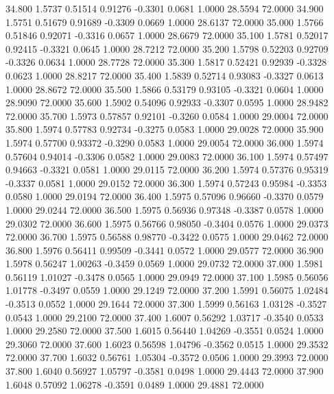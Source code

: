   34.800   1.5737   0.51514   0.91276  -0.3301   0.0681   1.0000  28.5594  72.0000
  34.900   1.5751   0.51679   0.91689  -0.3309   0.0669   1.0000  28.6137  72.0000
  35.000   1.5766   0.51846   0.92071  -0.3316   0.0657   1.0000  28.6679  72.0000
  35.100   1.5781   0.52017   0.92415  -0.3321   0.0645   1.0000  28.7212  72.0000
  35.200   1.5798   0.52203   0.92709  -0.3326   0.0634   1.0000  28.7728  72.0000
  35.300   1.5817   0.52421   0.92939  -0.3328   0.0623   1.0000  28.8217  72.0000
  35.400   1.5839   0.52714   0.93083  -0.3327   0.0613   1.0000  28.8672  72.0000
  35.500   1.5866   0.53179   0.93105  -0.3321   0.0604   1.0000  28.9090  72.0000
  35.600   1.5902   0.54096   0.92933  -0.3307   0.0595   1.0000  28.9482  72.0000
  35.700   1.5973   0.57857   0.92101  -0.3260   0.0584   1.0000  29.0004  72.0000
  35.800   1.5974   0.57783   0.92734  -0.3275   0.0583   1.0000  29.0028  72.0000
  35.900   1.5974   0.57700   0.93372  -0.3290   0.0583   1.0000  29.0054  72.0000
  36.000   1.5974   0.57604   0.94014  -0.3306   0.0582   1.0000  29.0083  72.0000
  36.100   1.5974   0.57497   0.94663  -0.3321   0.0581   1.0000  29.0115  72.0000
  36.200   1.5974   0.57376   0.95319  -0.3337   0.0581   1.0000  29.0152  72.0000
  36.300   1.5974   0.57243   0.95984  -0.3353   0.0580   1.0000  29.0194  72.0000
  36.400   1.5975   0.57096   0.96660  -0.3370   0.0579   1.0000  29.0244  72.0000
  36.500   1.5975   0.56936   0.97348  -0.3387   0.0578   1.0000  29.0302  72.0000
  36.600   1.5975   0.56766   0.98050  -0.3404   0.0576   1.0000  29.0373  72.0000
  36.700   1.5975   0.56588   0.98770  -0.3422   0.0575   1.0000  29.0462  72.0000
  36.800   1.5976   0.56411   0.99509  -0.3441   0.0572   1.0000  29.0577  72.0000
  36.900   1.5978   0.56247   1.00263  -0.3459   0.0569   1.0000  29.0732  72.0000
  37.000   1.5981   0.56119   1.01027  -0.3478   0.0565   1.0000  29.0949  72.0000
  37.100   1.5985   0.56056   1.01778  -0.3497   0.0559   1.0000  29.1249  72.0000
  37.200   1.5991   0.56075   1.02484  -0.3513   0.0552   1.0000  29.1644  72.0000
  37.300   1.5999   0.56163   1.03128  -0.3527   0.0543   1.0000  29.2100  72.0000
  37.400   1.6007   0.56292   1.03717  -0.3540   0.0533   1.0000  29.2580  72.0000
  37.500   1.6015   0.56440   1.04269  -0.3551   0.0524   1.0000  29.3060  72.0000
  37.600   1.6023   0.56598   1.04796  -0.3562   0.0515   1.0000  29.3532  72.0000
  37.700   1.6032   0.56761   1.05304  -0.3572   0.0506   1.0000  29.3993  72.0000
  37.800   1.6040   0.56927   1.05797  -0.3581   0.0498   1.0000  29.4443  72.0000
  37.900   1.6048   0.57092   1.06278  -0.3591   0.0489   1.0000  29.4881  72.0000
